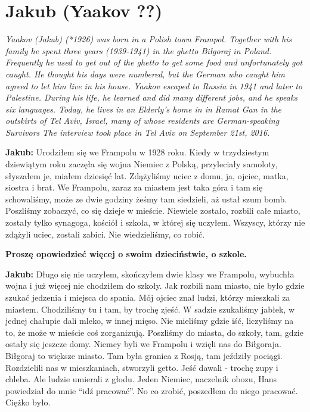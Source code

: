 \section{Jakub (Yaakov ??)}

\textit{Yaakov (Jakub) (*1926) was born in a Polish town Frampol. Together with his family he spent three years (1939-1941) in the ghetto Biłgoraj in Poland. Frequently he used to get out of the ghetto to get some food and unfortunately got caught. He thought his days were numbered, but the German who caught him agreed to let him live in his house. Yaakov escaped to Russia in 1941 and later to Palestine. During his life, he learned and did many different jobs, and he speaks six languages. Today, he lives in an Elderly’s home in in Ramat Gan in the outskirts of Tel Aviv, Israel, many of whose residents are German-speaking Survivors The interview took place in Tel Aviv on September 21st, 2016.}\par
\vspace*{2em}
\textbf{Jakub:} Urodziłem się we Frampolu w 1928 roku. Kiedy w trzydziestym dziewiątym roku zaczęła się wojna Niemiec z Polską, przyleciały samoloty, słyszałem je, miałem dziesięć lat. Zdążyliśmy uciec z domu, ja, ojciec, matka, siostra i brat. We Frampolu, zaraz za miastem jest taka góra i tam się schowaliśmy, może ze dwie godziny żeśmy tam siedzieli, aż ustał szum bomb. Poszliśmy zobaczyć, co się dzieje w mieście. Niewiele zostało, rozbili całe miasto, zostały tylko synagoga, kościół i szkoła, w której się uczyłem. Wszyscy, którzy nie zdążyli uciec, zostali zabici. Nie wiedzieliśmy, co robić.  

\textbf{Proszę opowiedzieć więcej o swoim dzieciństwie, o szkole.} 

\textbf{Jakub:} Długo się nie uczyłem, skończyłem dwie klasy we Frampolu, wybuchła wojna i już więcej nie chodziłem do szkoły. Jak rozbili nam miasto, nie było gdzie szukać jedzenia i miejsca do spania. Mój ojciec znał ludzi, którzy mieszkali za miastem. Chodziliśmy tu i tam, by trochę zjeść. W sadzie szukaliśmy jabłek, w jednej chałupie dali mleko, w innej mięso. Nie mieliśmy gdzie iść, liczyliśmy na to, że może w mieście coś zorganizują. Poszliśmy do miasta, do szkoły, tam, gdzie ostały się jeszcze domy. Niemcy byli we Frampolu i wzięli nas do Biłgoraja. Biłgoraj to większe miasto. Tam była granica z Rosją, tam jeździły pociągi. Rozdzielili nas w mieszkaniach, stworzyli getto. Jeść dawali - trochę zupy i chleba. Ale ludzie umierali z głodu. Jeden Niemiec, naczelnik obozu, Hans powiedział do mnie "`idź pracować"'. No co zrobić, poszedłem do niego pracować. Ciężko było.

